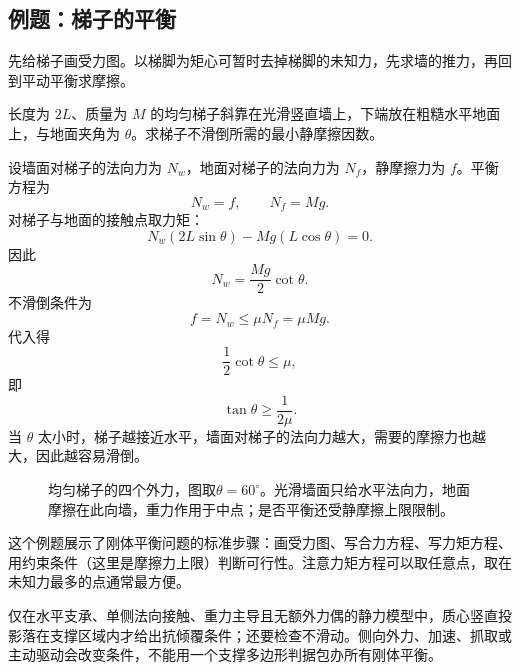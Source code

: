 \subsection{例题：梯子的平衡}

先给梯子画受力图。以梯脚为矩心可暂时去掉梯脚的未知力，先求墙的推力，再回到平动平衡求摩擦。

\begin{example}[斜靠在墙上的梯子]
长度为 \(2L\)、质量为 \(M\) 的均匀梯子斜靠在光滑竖直墙上，下端放在粗糙水平地面上，与地面夹角为 \(\theta\)。求梯子不滑倒所需的最小静摩擦因数。

设墙面对梯子的法向力为 \(N_w\)，地面对梯子的法向力为 \(N_f\)，静摩擦力为 \(f\)。平衡方程为
\[
N_w=f,\qquad N_f=Mg.
\]
对梯子与地面的接触点取力矩：
\[
N_w(2L\sin\theta)-Mg(L\cos\theta)=0.
\]
因此
\[
N_w=\frac{Mg}{2}\cot\theta.
\]
不滑倒条件为
\[
f=N_w\le \mu N_f=\mu Mg.
\]
代入得
\[
\frac12\cot\theta\le\mu,
\]
即
\[
\tan\theta\ge\frac{1}{2\mu}.
\]
当 \(\theta\) 太小时，梯子越接近水平，墙面对梯子的法向力越大，需要的摩擦力也越大，因此越容易滑倒。
\end{example}

\begin{figure}[htbp]
\centering
{}
\caption{均匀梯子的四个外力，图取$\theta=60^\circ$。光滑墙面只给水平法向力，地面摩擦在此向墙，重力作用于中点；是否平衡还受静摩擦上限限制。}
\label{fig:rigid-ladder}
\end{figure}

这个例题展示了刚体平衡问题的标准步骤：画受力图、写合力方程、写力矩方程、用约束条件（这里是摩擦力上限）判断可行性。注意力矩方程可以取任意点，取在未知力最多的点通常最方便。

\begin{physicsbox}
仅在水平支承、单侧法向接触、重力主导且无额外力偶的静力模型中，质心竖直投影落在支撑区域内才给出抗倾覆条件；还要检查不滑动。侧向外力、加速、抓取或主动驱动会改变条件，不能用一个支撑多边形判据包办所有刚体平衡。
\end{physicsbox}

